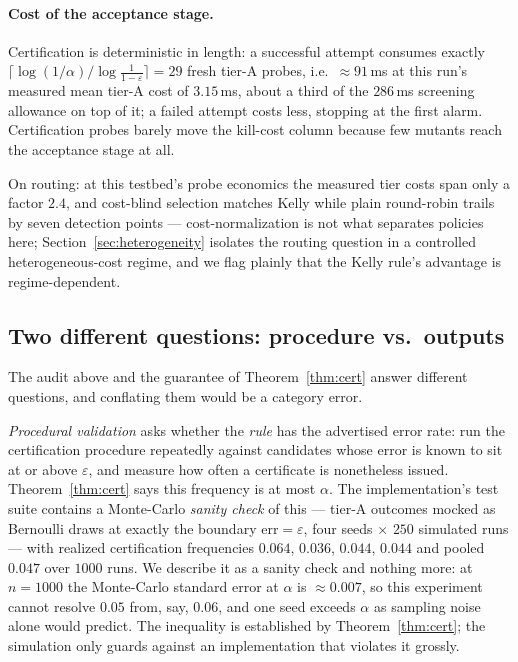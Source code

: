 \documentclass[pdflatex,sn-mathphys-num]{sn-jnl}
\theoremstyle{thmstyleone}
\theoremstyle{thmstyletwo}
\begin{document}
\paragraph{Cost of the acceptance stage.} Certification is
deterministic in length: a successful attempt consumes exactly
$\lceil \log(1/\alpha)/\log\frac{1}{1-\varepsilon} \rceil = 29$ fresh
tier-A probes, i.e.\ ${\approx}91$\,ms at this run's measured mean
tier-A cost of $3.15$\,ms, about a third of the $286$\,ms screening
allowance on top of it; a failed attempt costs less, stopping at the first
alarm. Certification probes barely move the kill-cost column because
few mutants reach the acceptance stage at all.

On routing: at this testbed's probe economics the measured tier costs
span only a factor $2.4$, and cost-blind selection matches Kelly
while plain round-robin trails by seven detection points ---
cost-normalization is not what separates policies here;
Section~\ref{sec:heterogeneity} isolates the routing question in a
controlled heterogeneous-cost regime, and we flag plainly that the
Kelly rule's advantage is regime-dependent.

\subsection{Two different questions: procedure vs.\ outputs}
\label{sec:validation}

The audit above and the guarantee of Theorem~\ref{thm:cert} answer
different questions, and conflating them would be a category error.

\emph{Procedural validation} asks whether the \emph{rule} has the
advertised error rate: run the certification procedure repeatedly
against candidates whose error is known to sit at or above
$\varepsilon$, and measure how often a certificate is nonetheless
issued. Theorem~\ref{thm:cert} says this frequency is at most
$\alpha$. The implementation's test suite contains a Monte-Carlo
\emph{sanity check} of this --- tier-A outcomes mocked as Bernoulli
draws at exactly the boundary $\mathrm{err} = \varepsilon$, four
seeds $\times$ $250$ simulated runs --- with realized certification
frequencies $0.064$, $0.036$, $0.044$, $0.044$ and pooled $0.047$
over $1000$ runs. We describe it as a sanity check and nothing more:
at $n = 1000$ the Monte-Carlo standard error at $\alpha$ is
${\approx}0.007$, so this experiment cannot resolve $0.05$ from,
say, $0.06$, and one seed exceeds $\alpha$ as sampling noise alone
would predict. The inequality is established by
Theorem~\ref{thm:cert}; the simulation only guards against an
implementation that violates it grossly.
\end{document}
